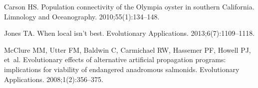 \documentclass[10pt,letterpaper]{article}
\begin{document}
\begin{thebibliography}{10}
Carson HS.
\newblock Population connectivity of the Olympia oyster in southern California.
\newblock Limnology and Oceanography. 2010;55(1):134--148.

Jones TA.
\newblock When local isn't best.
\newblock Evolutionary Applications. 2013;6(7):1109--1118.

McClure MM, Utter FM, Baldwin C, Carmichael RW, Hassemer PF, Howell PJ, et~al.
\newblock Evolutionary effects of alternative artificial propagation programs:
  implications for viability of endangered anadromous salmonids.
\newblock Evolutionary Applications. 2008;1(2):356--375.

\end{thebibliography}
\end{document}
